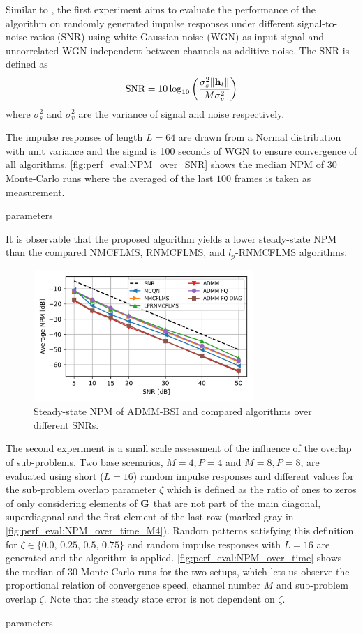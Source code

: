\documentclass{article}
\newcommand{\h}{\mtxb{h}}
\begin{document}
Similar to \cite{}, the first experiment aims to evaluate the performance of the algorithm on randomly generated impulse responses under different signal-to-noise ratios (SNR) using white Gaussian noise (WGN) as input signal and uncorrelated WGN independent between channels as additive noise.
The SNR is defined as
\begin{equation}
    \text{SNR} = 10 \log_{10} \left(\frac{\sigma_s^2 \| \h_t \|}{M \sigma_v^2} \right)
\end{equation}
where \(\sigma_s^2\) and \(\sigma_v^2\) are the variance of signal and noise respectively.

The impulse responses of length \(L=64\) are drawn from a Normal distribution with unit variance and the signal is 100 seconds of WGN to ensure convergence of all algorithms.
\autoref{fig:perf_eval:NPM_over_SNR} shows the median NPM of 30 Monte-Carlo runs where the averaged of the last \(100\) frames is taken as measurement.
\begin{attention}
    parameters
\end{attention}
It is observable that the proposed algorithm yields a lower steady-state NPM than the compared NMCFLMS, RNMCFLMS, and \(l_p\)-RNMCFLMS algorithms.
\begin{figure}
    \centering
    \includegraphics[height=5cm]{python/plots/NPM_over_SNR_L16.png}
    \caption{Steady-state NPM of ADMM-BSI and compared algorithms over different SNRs.}
    \label{fig:perf_eval:NPM_over_SNR}
\end{figure}

The second experiment is a small scale assessment of the influence of the overlap of sub-problems.
Two base scenarios, \(M=4,P=4\) and \(M=8,P=8\), are evaluated using short (\(L=16\)) random impulse responses and different values for the sub-problem overlap parameter \(\zeta\) which is defined as the ratio of ones to zeros of only considering elements of \(\bm{\mathrm{G}}\) that are not part of the main diagonal, superdiagonal and the first element of the last row (marked gray in \autoref{fig:perf_eval:NPM_over_time_M4}).
Random patterns satisfying this definition for \(\zeta \in \{0.0,\,0.25,\,0.5,\,0.75\}\) and random impulse responses with \(L=16\) are generated and the algorithm is applied.
\autoref{fig:perf_eval:NPM_over_time} shows the median of 30 Monte-Carlo runs for the two setups, which lets us observe the proportional relation of convergence speed, channel number \(M\) and sub-problem overlap \(\zeta\).
Note that the steady state error is not dependent on \(\zeta\).
\begin{attention}
    parameters
\end{attention}
\end{document}
